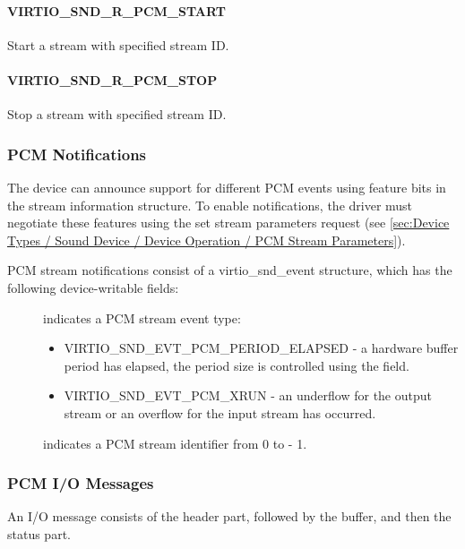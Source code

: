 \paragraph{VIRTIO_SND_R_PCM_START}

Start a stream with specified stream ID.

\paragraph{VIRTIO_SND_R_PCM_STOP}

Stop a stream with specified stream ID.

\subsubsection{PCM Notifications}

The device can announce support for different PCM events using feature bits
in the stream information structure. To enable notifications, the driver
must negotiate these features using the set stream parameters request
(see \ref{sec:Device Types / Sound Device / Device Operation / PCM Stream Parameters}).

PCM stream notifications consist of a virtio_snd_event structure, which has the
following device-writable fields:

\begin{description}
\item[] indicates a PCM stream event type:
\begin{itemize}
\item VIRTIO_SND_EVT_PCM_PERIOD_ELAPSED - a hardware buffer period has elapsed,
the period size is controlled using the  field.
\item VIRTIO_SND_EVT_PCM_XRUN - an underflow for the output stream or an overflow
for the input stream has occurred.
\end{itemize}
\item[] indicates a PCM stream identifier from 0 to  - 1.
\end{description}

\subsubsection{PCM I/O Messages}\label{sec:Device Types / Sound Device / Device Operation / PCM IO Messages}

An I/O message consists of the header part, followed by the buffer, and then
the status part.

